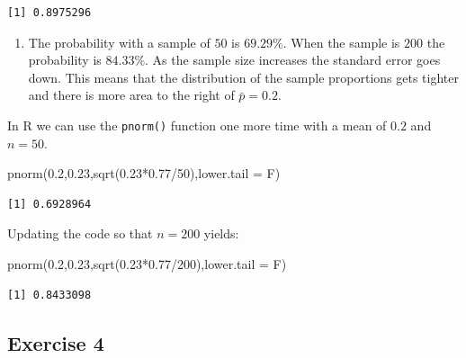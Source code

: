 \documentclass[
  letterpaper,
  DIV=11,
  numbers=noendperiod]{scrreprt}
\newenvironment{Shaded}{\begin{snugshade}}{\end{snugshade}}
\newcommand{\AttributeTok}[1]{\textcolor[rgb]{0.40,0.45,0.13}{#1}}
\newcommand{\DecValTok}[1]{\textcolor[rgb]{0.68,0.00,0.00}{#1}}
\newcommand{\FloatTok}[1]{\textcolor[rgb]{0.68,0.00,0.00}{#1}}
\newcommand{\FunctionTok}[1]{\textcolor[rgb]{0.28,0.35,0.67}{#1}}
\newcommand{\NormalTok}[1]{\textcolor[rgb]{0.00,0.23,0.31}{#1}}
\newcommand{\SpecialCharTok}[1]{\textcolor[rgb]{0.37,0.37,0.37}{#1}}
\providecommand{\tightlist}{%
  \setlength{\itemsep}{0pt}\setlength{\parskip}{0pt}}\usepackage{longtable,booktabs,array}
\begin{document}
\begin{verbatim}
[1] 0.8975296
\end{verbatim}

\begin{blackbox}

\begin{enumerate}
\def\labelenumi{\arabic{enumi}.}
\setcounter{enumi}{1}
\tightlist
\item
  The probability with a sample of \(50\) is \(69.29\)\%. When the
  sample is \(200\) the probability is \(84.33\)\%. As the sample size
  increases the standard error goes down. This means that the
  distribution of the sample proportions gets tighter and there is more
  area to the right of \(\bar{p}=0.2\).
\end{enumerate}

\end{blackbox}

In R we can use the \texttt{pnorm()} function one more time with a mean
of \(0.2\) and \(n=50\).

\begin{Shaded}
\begin{Highlighting}[numbers=left,,]
\FunctionTok{pnorm}\NormalTok{(}\FloatTok{0.2}\NormalTok{,}\FloatTok{0.23}\NormalTok{,}\FunctionTok{sqrt}\NormalTok{(}\FloatTok{0.23}\SpecialCharTok{*}\FloatTok{0.77}\SpecialCharTok{/}\DecValTok{50}\NormalTok{),}\AttributeTok{lower.tail =}\NormalTok{ F)}
\end{Highlighting}
\end{Shaded}

\begin{verbatim}
[1] 0.6928964
\end{verbatim}

Updating the code so that \(n=200\) yields:

\begin{Shaded}
\begin{Highlighting}[numbers=left,,]
\FunctionTok{pnorm}\NormalTok{(}\FloatTok{0.2}\NormalTok{,}\FloatTok{0.23}\NormalTok{,}\FunctionTok{sqrt}\NormalTok{(}\FloatTok{0.23}\SpecialCharTok{*}\FloatTok{0.77}\SpecialCharTok{/}\DecValTok{200}\NormalTok{),}\AttributeTok{lower.tail =}\NormalTok{ F)}
\end{Highlighting}
\end{Shaded}

\begin{verbatim}
[1] 0.8433098
\end{verbatim}

\hypertarget{exercise-4-9}{%
\subsection*{Exercise 4}\label{exercise-4-9}}
\end{document}
